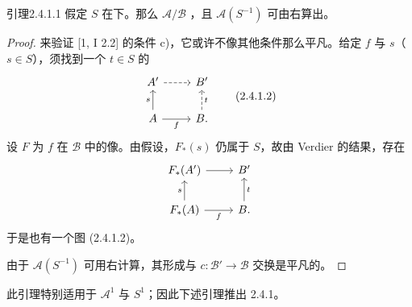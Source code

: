 \begin{SGAresult}{引理}{2.4.1.1}
假定 $S$ 在下。那么 $\mathcal A/\mathcal B$ ，且 $\mathcal A(S^{-1})$ 可由右算出。
\end{SGAresult}
\begin{proof}
来验证 [1, I 2.2] 的条件 c)，它或许不像其他条件那么平凡。给定 $f$ 与 $s$（$s\in S$），须找到一个 $t\in S$ 的
\[
\begin{tikzcd}
A'\arrow[r,dashed]&B'\\
A\arrow[u,"s"]\arrow[r,"f"']&B\arrow[u,dashed,"t"'].
\end{tikzcd}\tag{2.4.1.2}
\]
设 $F$ 为 $f$ 在 $\mathcal B$ 中的像。由假设，$F_*(s)$ 仍属于 $S$，故由 Verdier 的结果，存在
\[
\begin{tikzcd}
F_*(A')\arrow[r]&B'\\
F_*(A)\arrow[u,"s"]\arrow[r,"f"']&B\arrow[u,"t"'].
\end{tikzcd}
\]
于是也有一个图 (2.4.1.2)。

由于 $\mathcal A(S^{-1})$ 可用右计算，其形成与 $c:\mathcal B'\to\mathcal B$ 交换是平凡的。
\end{proof}
此引理特别适用于 $\mathcal A^1$ 与 $S^1$；因此下述引理推出 2.4.1。

